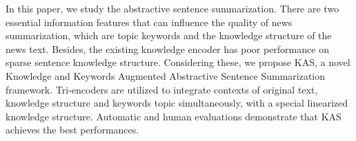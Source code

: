 In this paper, we study the abstractive sentence summarization. There are two essential information features that can influence the quality of news summarization, which are topic keywords and the knowledge structure of the news text. Besides, the existing knowledge encoder has poor performance on sparse sentence knowledge structure. Considering these, we propose KAS, a novel Knowledge and Keywords Augmented Abstractive Sentence Summarization framework. Tri-encoders are utilized to integrate contexts of original text, knowledge structure and keywords topic simultaneously, with a special linearized knowledge structure. Automatic and human evaluations demonstrate that KAS achieves the best performances.
